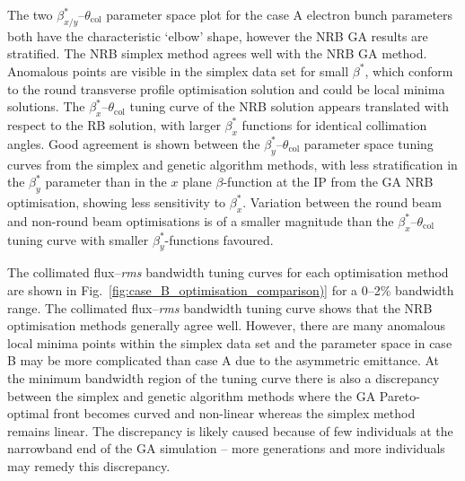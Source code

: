 \documentclass[../main.tex]{subfiles}
\begin{document}
The two $\beta_{x/y}^{*}$--$\theta_{\mathrm{col}}$ parameter space plot for the case A electron bunch parameters both have the characteristic `elbow' shape, however the NRB GA results are stratified. The NRB simplex method agrees well with the NRB GA method. Anomalous points are visible in the simplex data set for small $\beta^{*}$, which conform to the round transverse profile optimisation solution and could be local minima solutions. The $\beta_{x}^{*}$--$\theta_{\mathrm{col}}$ tuning curve of the NRB solution appears translated with respect to the RB solution, with larger $\beta_{x}^{*}$ functions for identical collimation angles. Good agreement is shown between the $\beta_{y}^{*}$--$\theta_{\mathrm{col}}$ parameter space tuning curves from the simplex and genetic algorithm methods, with less stratification in the $\beta_{y}^{*}$ parameter than in the $x$ plane $\beta$-function at the IP from the GA NRB optimisation, showing less sensitivity to $\beta_{x}^{*}$. Variation between the round beam and non-round beam optimisations is of a smaller magnitude than the $\beta_{x}^{*}$--$\theta_{\mathrm{col}}$ tuning curve with smaller $\beta_{y}^{*}$-functions favoured.   


The collimated flux--\textit{rms} bandwidth tuning curves for each optimisation method are shown in Fig.~\ref{fig:case_B_optimisation_comparison)} for a 0--2\% bandwidth range. The collimated flux--\textit{rms} bandwidth tuning curve shows that the NRB optimisation methods generally agree well. However, there are many anomalous local minima points within the simplex data set and the parameter space in case B may be more complicated than case A due to the asymmetric emittance. At the minimum bandwidth region of the tuning curve there is also a discrepancy between the simplex and genetic algorithm methods where the GA Pareto-optimal front becomes curved and non-linear whereas the simplex method remains linear. The discrepancy is likely caused because of few individuals at the narrowband end of the GA simulation -- more generations and more individuals may remedy this discrepancy.
\end{document}

